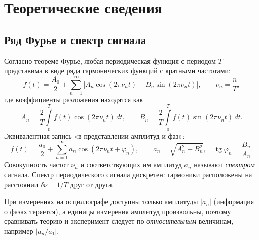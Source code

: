 \documentclass[a4paper,12pt]{article}
\begin{document}
\section{Теоретические сведения}

\subsection{Ряд Фурье и спектр сигнала}
Согласно теореме Фурье, любая периодическая функция с периодом $T$
представима в виде ряда гармонических функций с кратными частотами:
\begin{equation}
    \label{eq:fourier}
    f(t) = \frac{A_0}{2}
    + \sum_{n=1}^{\infty}\bigl[A_n\cos(2\pi\nu_n t) + B_n\sin(2\pi\nu_n t)\bigr],
    \qquad \nu_n = \frac{n}{T},
\end{equation}
где коэффициенты разложения находятся как
\begin{equation}
    \label{eq:fourier_coef}
    A_n = \frac{2}{T}\int\limits_0^T f(t)\cos(2\pi\nu_n t)\,dt,
    \qquad
    B_n = \frac{2}{T}\int\limits_0^T f(t)\sin(2\pi\nu_n t)\,dt.
\end{equation}
Эквивалентная запись «в представлении амплитуд и фаз»:
\begin{equation}
    \label{eq:fourier_amp}
    f(t) = \frac{a_0}{2} + \sum_{n=1}^{\infty} a_n\cos(2\pi\nu_n t + \varphi_n),
    \qquad
    a_n = \sqrt{A_n^2 + B_n^2},\quad \operatorname{tg}\varphi_n = \frac{B_n}{A_n}.
\end{equation}
Совокупность частот $\nu_n$ и соответствующих им амплитуд $a_n$ называют
\emph{спектром} сигнала. Спектр периодического сигнала дискретен: гармоники
расположены на расстоянии $\delta\nu = 1/T$ друг от друга.

При измерениях на осциллографе доступны только амплитуды $|a_n|$ (информация
о фазах теряется), а единицы измерения амплитуд произвольны, поэтому
сравнивать теорию и эксперимент следует по \emph{относительным} величинам,
например $|a_n/a_1|$.
\end{document}
